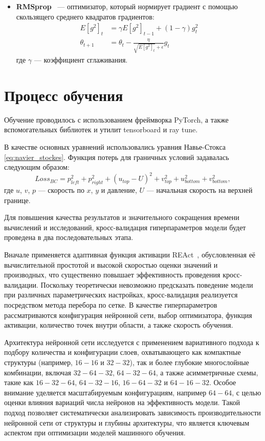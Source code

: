 \begin{itemize}
    \item \textbf{RMSprop}~\cite{tieleman2012lecture} --- оптимизатор, который нормирует градиент с помощью скользящего среднего квадратов градиентов:
    \[
    \begin{aligned}
        E[g^2]_t &= \gamma E[g^2]_{t-1} + (1 - \gamma) g_t^2 \\
        \theta_{t+1} &= \theta_t - \frac{\eta}{\sqrt{E[g^2]_t} + \epsilon} g_t
    \end{aligned}
    \]
    где $\gamma$ --- коэффициент сглаживания.
\end{itemize}

\section{Процесс обучения}
Обучение проводилось с использованием фреймворка PyTorch, а также вспомогательных
библиотек и утилит tensorboard и ray tune.

В качестве основных уравнений использовались уравния Навье-Стокса \eqref{eq:navier_stockes}.
Функция потерь для граничных условий задавалась следующим образом:
\begin{equation}
    Loss_{BC} = p_{left}^2 + p_{right}^2 + (u_{top} - U)^2 + v_{top}^2 + u_{bottom}^2 + v_{bottom}^2,
\end{equation}
где $u$, $v$, $p$ --- скорость по $x$, $y$ и давление, $U$ --- начальная скорость на 
верхней границе.

Для повышения качества результатов и значительного сокращения времени вычислений и
исследований, кросс-валидация гиперпараметров модели будет проведена в два
последовательных этапа.

Вначале применяется адаптивная функция активации
REAct~\cite{0d752c79fb816703274a3d37f85a85689a2a9405}, обусловленная её вычислительной
простотой и высокой скоростью оценки значений и производных, что существенно
повышает эффективность проведения кросс-валидации. Поскольку теоретически
невозможно предсказать поведение модели при различных параметрических настройках,
кросс-валидация реализуется посредством метода перебора по сетке. В качестве
гиперпараметров рассматриваются конфигурация нейронной сети, выбор оптимизатора,
функция активации, количество точек внутри области, а также скорость обучения.


Архитектура нейронной сети исследуется с применением вариативного подхода к
подбору количества и конфигурации слоев, охватывающего как компактные структуры
(например, $16-16$ и $32-32$), так и более глубокие многослойные комбинации,
включая $32-64-32$, $64-32-64$, а также асимметричные схемы, такие как
$16-32-64$, $64-32-16$, $16-64-32$ и $64-16-32$. Особое внимание уделяется
масштабируемым конфигурациям, например $64-64$, с целью оценки влияния
вариаций числа нейронов на эффективность модели. Такой подход позволяет
систематически анализировать зависимость производительности нейронной сети
от структуры и глубины архитектуры, что является ключевым аспектом при
оптимизации моделей машинного обучения.

